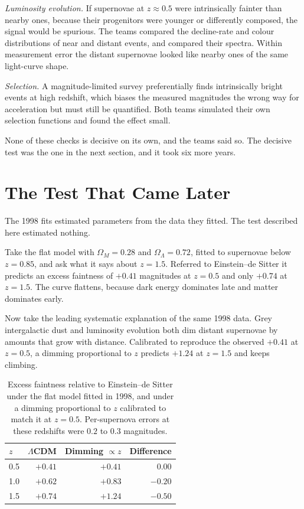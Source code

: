 \documentclass[11pt]{article}
\begin{document}
\emph{Luminosity evolution.}  If supernovae at $z \approx 0.5$ were
intrinsically fainter than nearby ones, because their progenitors were younger
or differently composed, the signal would be spurious.  The teams compared the
decline-rate and colour distributions of near and distant events, and compared
their spectra.  Within measurement error the distant supernovae looked like
nearby ones of the same light-curve shape.

\emph{Selection.}  A magnitude-limited survey preferentially finds
intrinsically bright events at high redshift, which biases the measured
magnitudes the wrong way for acceleration but must still be quantified.  Both
teams simulated their own selection functions and found the effect small.

None of these checks is decisive on its own, and the teams said so.  The
decisive test was the one in the next section, and it took six more years.

\section{The Test That Came Later}
\label{sec:prediction}

The 1998 fits estimated parameters from the data they fitted.  The test
described here estimated nothing.

Take the flat model with $\Omega_M = 0.28$ and $\Omega_\Lambda = 0.72$, fitted
to supernovae below $z = 0.85$, and ask what it says about $z = 1.5$.
Referred to Einstein--de Sitter it predicts an excess faintness of $+0.41$
magnitudes at $z = 0.5$ and only $+0.74$ at $z = 1.5$.  The curve flattens,
because dark energy dominates late and matter dominates early.

Now take the leading systematic explanation of the same 1998 data.  Grey
intergalactic dust and luminosity evolution both dim distant supernovae by
amounts that grow with distance.  Calibrated to reproduce the observed $+0.41$
at $z = 0.5$, a dimming proportional to $z$ predicts $+1.24$ at $z = 1.5$ and
keeps climbing.

\begin{table}[ht]
\centering
\caption{Excess faintness relative to Einstein--de Sitter under the flat model
fitted in 1998, and under a dimming proportional to $z$ calibrated to match it
at $z = 0.5$.  Per-supernova errors at these redshifts were $0.2$ to $0.3$
magnitudes.}
\label{tab:prediction}
\medskip
\begin{tabular}{lrrr}
\toprule
$z$ & $\Lambda$CDM & Dimming $\propto z$ & Difference \\
\midrule
0.5 & $+0.41$ & $+0.41$ & $0.00$ \\
1.0 & $+0.62$ & $+0.83$ & $-0.20$ \\
1.5 & $+0.74$ & $+1.24$ & $-0.50$ \\
\bottomrule
\end{tabular}
\end{table}
\end{document}
